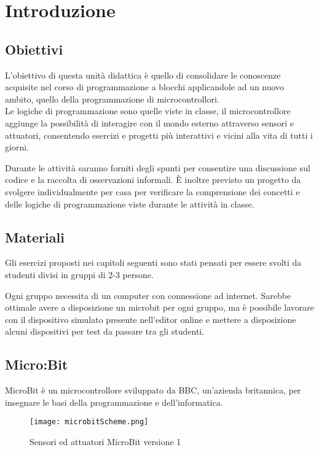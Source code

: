 \documentclass[../../docenti.tex]{subfiles}
\begin{document}
\section{Introduzione}

\subsection{Obiettivi}
L'obiettivo di questa unità didattica è quello di consolidare le conoscenze acquisite nel corso di programmazione a blocchi applicandole ad un nuovo ambito, quello della programmazione di microcontrollori.\\
Le logiche di programmazione sono quelle viste in classe, il microcontrollore aggiunge la possibilità di interagire con il mondo esterno attraverso sensori e attuatori, consentendo esercizi e progetti più interattivi e vicini alla vita di tutti i giorni. 

Durante le attività saranno forniti degli spunti per consentire una discussione sul codice e la raccolta di osservazioni informali.
È inoltre previsto un progetto da svolgere individualmente per casa per verificare la comprensione dei concetti e delle logiche di programmazione viste durante le attività in classe.

\subsection{Materiali}
Gli esercizi proposti nei capitoli seguenti sono stati pensati per essere svolti da studenti divisi in gruppi di 2-3 persone.

Ogni gruppo necessita di un computer con connessione ad internet. Sarebbe ottimale avere a disposizione un microbit per ogni gruppo, ma è possibile lavorare con il dispositivo simulato presente nell'editor online e mettere a disposizione alcuni dispositivi per test da passare tra gli studenti.

\newpage
\subsection{Micro:Bit}
 MicroBit è un microcontrollore sviluppato da BBC, un'azienda britannica, per insegnare le basi della programmazione e dell'informatica.

\begin{figure}[H]
 	\centering
 	\texttt{[image: microbitScheme.png]}
 	\caption{Sensori ed attuatori MicroBit versione 1 \parencite{MicrobitOverview}}
 	\label{fig:microbit}
\end{figure}
\end{document}
